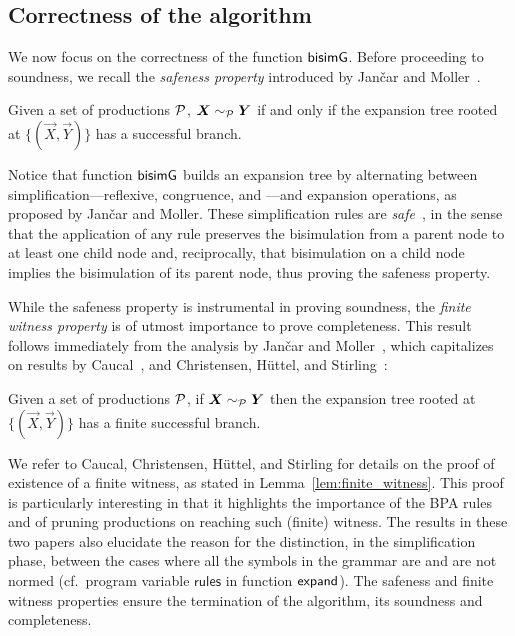 \subsection{Correctness of the algorithm}

We now focus on the correctness of the function $\mathsf{bisimG}$.  Before
proceeding to soundness, we recall the \emph{safeness property}
introduced by Jan{\v{c}}ar and Moller~\cite{janvcar1999techniques}.

\begin{lemma} 
  \label{lem:safeness}
  Given a set of productions $\mathcal P$,
  $\vec X \ProdEquiv \vec Y$ if and only if the expansion tree rooted
  at $\{(\vec X, \vec Y)\}$ has a successful branch.
\end{lemma}

Notice that function $\mathsf{bisimG}$ builds an expansion tree by alternating
between simplification---reflexive, congruence, and \BPA---and
expansion operations, as proposed by Jan{\v{c}}ar and Moller.
%
These simplification rules are
\emph{safe}~\cite{janvcar1999techniques}, in the sense that the
application of any rule preserves the bisimulation from a parent node
to at least one child node and, reciprocally, that bisimulation on a
child node implies the bisimulation of its parent node, thus proving
the safeness property.

While the safeness property is instrumental in proving
soundness, the \emph{finite witness property} is of
utmost importance to prove completeness. This result follows
immediately from the analysis by Jan{\v{c}}ar and
Moller~\cite{janvcar1999techniques}, which capitalizes on results by
Caucal~\cite{caucal1986decidabilite}, and Christensen, H{\"{u}}ttel, and
Stirling~\cite{DBLP:journals/iandc/ChristensenHS95}:

\begin{lemma} 
\label{lem:finite_witness}
	Given a set of productions $\mathcal P$,
	if $\vec X \ProdEquiv \vec Y$ then the expansion tree rooted at
	$\{(\vec X, \vec Y)\}$ has a finite successful branch.
\end{lemma}

We refer to Caucal, Christensen, H{\"{u}}ttel, and Stirling for
details on the proof of existence of a finite witness, as stated in
Lemma~\ref{lem:finite_witness}. This proof is particularly interesting
in that it highlights the importance of the BPA rules and of pruning
productions on reaching such (finite) witness. The results in these
two papers also elucidate the reason for the distinction, in the
simplification phase, between the cases where all the symbols in the
grammar are and are not normed (cf.~program variable $\mathsf{rules}$
in function $\mathsf{expand}$).
%
The safeness and finite witness properties ensure the termination of
the algorithm, its soundness and completeness.

